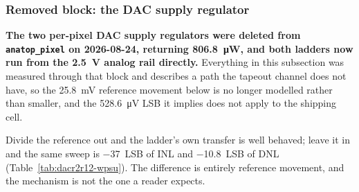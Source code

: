 %
%
%

\subsubsection{Removed block: the DAC supply regulator}
\label{sss:dacr2r12-supply}

\textbf{The two per-pixel DAC supply regulators were deleted from
\texttt{anatop\_pixel} on 2026-08-24, returning \SI{806.8}{\micro\watt}, and both
ladders now run from the \SI{2.5}{\volt} analog rail directly.} Everything in this
subsection was measured through that block and describes a path the tapeout channel
does not have, so the \SI{25.8}{\milli\volt} reference movement below is no longer
modelled rather than smaller, and the \SI{528.6}{\micro\volt} LSB it implies does not
apply to the shipping cell.

Divide the reference out and the ladder's own transfer is well behaved; leave it in and
the same sweep is \SI{-37}{LSB} of INL and \SI{-10.8}{LSB} of DNL
(Table~\ref{tab:dacr2r12-wpsu}). The difference is entirely reference movement, and the
mechanism is not the one a reader expects.


